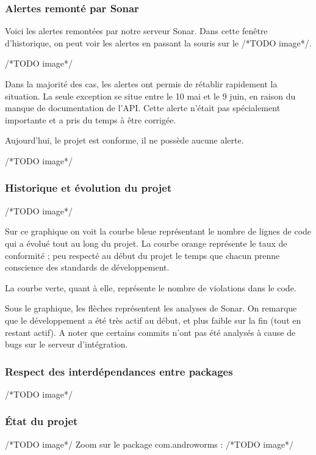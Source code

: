 \documentclass{report}
\begin{document}
\subsubsection{Alertes remonté par Sonar}

Voici les alertes remontées par notre serveur Sonar. Dans cette fenêtre d’historique, on peut voir les alertes en passant la souris sur le /*TODO image*/.

/*TODO image*/

Dans la majorité des cas, les alertes ont permis de rétablir rapidement la situation. La seule exception se situe entre le 10 mai et le 9 juin, en raison du manque de documentation de l’API. Cette alerte n’était pas spécialement importante et a pris du temps à être corrigée.

Aujourd’hui, le projet est conforme, il ne possède aucune alerte.

/*TODO image*/

\subsubsection{Historique et évolution du projet}

/*TODO image*/

Sur ce graphique on voit la courbe bleue représentant le nombre de lignes de code qui a évolué tout au long du projet. La courbe orange représente le taux de conformité ; peu respecté au début du projet le temps que chacun prenne conscience des standards de développement. 

La courbe verte, quant à elle, représente le nombre de violations dans le code.

Sous le graphique, les flèches représentent les analyses de Sonar. On remarque que le développement a été très actif au début, et plus faible sur la fin (tout en restant actif). A noter que certains commits n’ont pas été analysés à cause de bugs sur le serveur d’intégration.

\subsubsection{Respect des interdépendances entre packages}

/*TODO image*/

\subsubsection{État du projet}
/*TODO image*/
Zoom sur le package com.androworms :
/*TODO image*/
\end{document}
